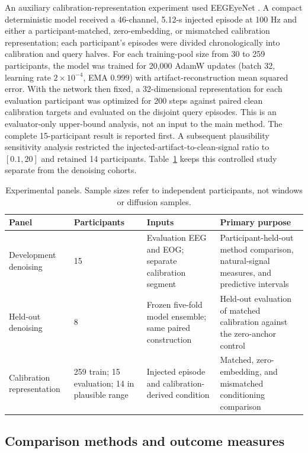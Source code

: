 An auxiliary calibration-representation experiment used EEGEyeNet \cite{kastrati2021eegeyenet}. A compact deterministic model received a 46-channel, 5.12-s injected episode at 100 Hz and either a participant-matched, zero-embedding, or mismatched calibration representation; each participant's episodes were divided chronologically into calibration and query halves. For each training-pool size from 30 to 259 participants, the model was trained for 20,000 AdamW updates (batch 32, learning rate $2\times10^{-4}$, EMA 0.999) with artifact-reconstruction mean squared error. With the network then fixed, a 32-dimensional representation for each evaluation participant was optimized for 200 steps against paired clean calibration targets and evaluated on the disjoint query episodes. This is an evaluator-only upper-bound analysis, not an input to the main method. The complete 15-participant result is reported first. A subsequent plausibility sensitivity analysis restricted the injected-artifact-to-clean-signal ratio to $[0.1,20]$ and retained 14 participants. Table~\ref{tab:panels} keeps this controlled study separate from the denoising cohorts.

\begin{table}[t]
\caption{Experimental panels. Sample sizes refer to independent participants, not windows or diffusion samples.}
\label{tab:panels}
\centering
\small
\begin{tabular}{@{}p{}p{}p{}p{}@{}}
\toprule
Panel & Participants & Inputs & Primary purpose \\
\midrule
Development denoising & 15 & Evaluation EEG and EOG; separate calibration segment & Participant-held-out method comparison, natural-signal measures, and predictive intervals \\
Held-out denoising & 8 & Frozen five-fold model ensemble; same paired construction & Held-out evaluation of matched calibration against the zero-anchor control \\
Calibration representation & 259 train; 15 evaluation; 14 in plausible range & Injected episode and calibration-derived condition & Matched, zero-embedding, and mismatched conditioning comparison \\
\bottomrule
\end{tabular}
\end{table}

\subsection{Comparison methods and outcome measures}


